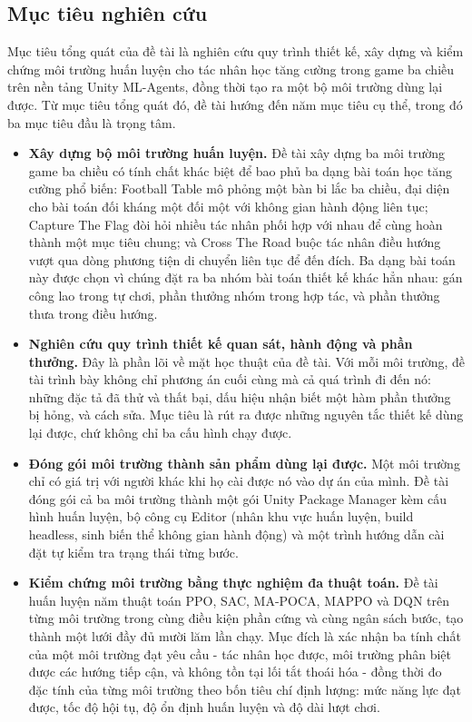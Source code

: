 \subsection{Mục tiêu nghiên cứu}

\indent Mục tiêu tổng quát của đề tài là nghiên cứu quy trình thiết kế, xây dựng và
kiểm chứng môi trường huấn luyện cho tác nhân học tăng cường trong game ba chiều trên
nền tảng Unity ML-Agents, đồng thời tạo ra một bộ môi trường dùng lại được. Từ mục tiêu
tổng quát đó, đề tài hướng đến năm mục tiêu cụ thể, trong đó ba mục tiêu đầu là trọng
tâm.

\begin{itemize}
    \item \textbf{Xây dựng bộ môi trường huấn luyện.} Đề tài xây dựng ba môi trường
    game ba chiều có tính chất khác biệt để bao phủ ba dạng bài toán học tăng cường
    phổ biến: Football Table mô phỏng một bàn bi lắc ba chiều, đại diện cho bài toán đối
    kháng một đối một với không gian hành động liên tục; Capture The Flag đòi hỏi nhiều
    tác nhân phối hợp với nhau để cùng hoàn thành một mục tiêu chung; và Cross The Road
    buộc tác nhân điều hướng vượt qua dòng phương tiện di chuyển liên tục để đến đích.
    Ba dạng bài toán này được chọn vì chúng đặt ra ba nhóm bài toán thiết kế khác hẳn
    nhau: gán công lao trong tự chơi, phần thưởng nhóm trong hợp tác, và phần thưởng
    thưa trong điều hướng.

    \item \textbf{Nghiên cứu quy trình thiết kế quan sát, hành động và phần thưởng.} Đây
    là phần lõi về mặt học thuật của đề tài. Với mỗi môi trường, đề tài trình bày không
    chỉ phương án cuối cùng mà cả quá trình đi đến nó: những đặc tả đã thử và thất bại,
    dấu hiệu nhận biết một hàm phần thưởng bị hỏng, và cách sửa. Mục tiêu là rút ra được
    những nguyên tắc thiết kế dùng lại được, chứ không chỉ ba cấu hình chạy được.

    \item \textbf{Đóng gói môi trường thành sản phẩm dùng lại được.} Một môi trường chỉ
    có giá trị với người khác khi họ cài được nó vào dự án của mình. Đề tài đóng gói cả
    ba môi trường thành một gói Unity Package Manager kèm cấu hình huấn luyện, bộ công cụ
    Editor (nhân khu vực huấn luyện, build headless, sinh biến thể không gian hành động)
    và một trình hướng dẫn cài đặt tự kiểm tra trạng thái từng bước.

    \item \textbf{Kiểm chứng môi trường bằng thực nghiệm đa thuật toán.} Đề tài huấn
    luyện năm thuật toán PPO, SAC, MA-POCA, MAPPO và DQN trên từng môi trường trong cùng
    điều kiện phần cứng và cùng ngân sách bước, tạo thành một lưới đầy đủ mười lăm lần
    chạy. Mục đích là xác nhận ba tính chất của một môi trường đạt yêu cầu - tác nhân học
    được, môi trường phân biệt được các hướng tiếp cận, và không tồn tại lối tắt thoái
    hóa - đồng thời đo đặc tính của từng môi trường theo bốn tiêu chí định lượng: mức
    năng lực đạt được, tốc độ hội tụ, độ ổn định huấn luyện và độ dài lượt chơi.


\end{itemize}
